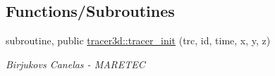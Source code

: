 \subsection*{Functions/\+Subroutines}
\begin{DoxyCompactItemize}
\item 
subroutine, public \mbox{\hyperlink{namespacetracer3d_a42aa514ae0b5c46c797ddaaa48c49991}{tracer3d\+::tracer\+\_\+init}} (trc, id, time, x, y, z)
\begin{DoxyCompactList}\small\item\em Birjukovs Canelas -\/ M\+A\+R\+E\+T\+EC \end{DoxyCompactList}\end{DoxyCompactItemize}
